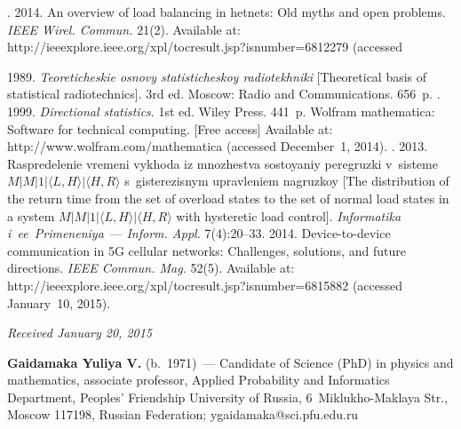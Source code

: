 \begin{multicols}{2}
{{\begin{thebibliography}{99}
. 2014. An overview of load
balancing in hetnets: Old myths and open problems. \textit{IEEE Wirel. Commun.} 21(2).
Available at: {\sf http://ieeexplore.ieee.org/\linebreak xpl/tocresult.jsp?isnumber=6812279} (accessed

 1989. \textit{Teoreticheskie osnovy statisticheskoy radiotekhniki} [Theoretical
basis of statistical radiotechnics]. 3rd ed. Moscow: Radio and Communications. 656~p.
. 1999. \textit{Directional statistics}. 1st ed. Wiley Press. 441~p.
Wolfram mathematica: Software for technical computing. [Free access] Available at: {\sf
http://www.wolfram.\linebreak com/mathematica} (accessed December~1, 2014).
. 2013. Raspredelenie
vremeni vykhoda iz mnozhestva sostoyaniy peregruzki v~sisteme $M\vert M\vert 1\vert \langle
L,H\rangle \vert \langle H,R\rangle$ s~gisterezisnym upravleniem nagruzkoy [The distribution of
the return time from the set of overload states to the set of normal load states in a system $M\vert
M\vert 1\vert \langle L,H\rangle \vert \langle H,R\rangle$ with hysteretic load control].
\textit{Informatika i~ee~Primeneniya}~--- \textit{Inform. Appl.} 7(4):20--33.
 2014. Device-to-device communication in
5G cellular networks: Challenges, solutions, and future directions.
\textit{IEEE Commun. Mag.} 52(5). Available at: {\sf http://ieeexplore.\linebreak ieee.org/xpl/tocresult.jsp?isnumber=6815882}
(accessed January~10, 2015).
\end{thebibliography}

 }
 }

\end{multicols}

\vspace*{-3pt}

\hfill{\small\textit{Received January 20, 2015}}



\Contr

\noindent
\textbf{Gaidamaka Yuliya V.} (b.\ 1971)~---
Candidate of Science (PhD) in physics and mathematics, associate
professor, Applied Probability and Informatics Department, Peoples' Friendship University of Russia,
6~Miklukho-Maklaya Str., Moscow 117198, Russian Federation;
ygaidamaka@sci.pfu.edu.ru

